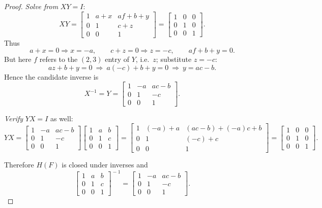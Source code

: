 \documentclass[12pt]{article}
\theoremstyle{definition}
\begin{document}
\begin{proof}
\emph{Solve from }$XY=I$:
\[
XY=
\begin{bmatrix}
1 & a+x & af+b+y\\[2pt]
0 & 1 & c+z\\[2pt]
0 & 0 & 1
\end{bmatrix}
=
\begin{bmatrix}1&0&0\\[2pt]0&1&0\\[2pt]0&0&1\end{bmatrix}.
\]
Thus
\[
a+x=0\Rightarrow x=-a,\qquad c+z=0\Rightarrow z=-c,\qquad
af+b+y=0.
\]
But here $f$ refers to the $(2,3)$ entry of $Y$, i.e.\ $z$; substitute $z=-c$:
\[
a z+b+y=0\ \Rightarrow\ a(-c)+b+y=0\ \Rightarrow\ y=ac-b.
\]
Hence the candidate inverse is
\[
X^{-1}=Y=\begin{bmatrix}1&-a&ac-b\\[2pt]0&1&-c\\[2pt]0&0&1\end{bmatrix}.
\]

\emph{Verify }$YX=I$ as well:
\[
YX=
\begin{bmatrix}1&-a&ac-b\\[2pt]0&1&-c\\[2pt]0&0&1\end{bmatrix}
\begin{bmatrix}1&a&b\\[2pt]0&1&c\\[2pt]0&0&1\end{bmatrix}
=
\begin{bmatrix}
1 & (-a)+a & (ac-b)+(-a)c+b\\[2pt]
0 & 1 & (-c)+c\\[2pt]
0 & 0 & 1
\end{bmatrix}
=
\begin{bmatrix}1&0&0\\[2pt]0&1&0\\[2pt]0&0&1\end{bmatrix}.
\]

Therefore $H(F)$ is closed under inverses and
\[
\boxed{\ \begin{bmatrix}1&a&b\\ 0&1&c\\ 0&0&1\end{bmatrix}^{\!\!-1}
=\begin{bmatrix}1&-a&ac-b\\ 0&1&-c\\ 0&0&1\end{bmatrix}. \ }
\]


\end{proof}
\end{document}
